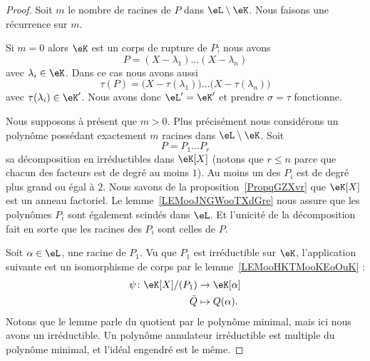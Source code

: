 \begin{proof}
	Soit \( m\) le nombre de racines de \( P\) dans \( \eL\setminus \eK\). Nous faisons une récurrence sur \( m\).

	Si \( m=0\) alors \( \eK\) est un corps de rupture de \( P\); nous avons
	\begin{equation}
		P=(X-\lambda_1)\ldots (X-\lambda_n)
	\end{equation}
	avec \( \lambda_i\in \eK\). Dans ce cas nous avons aussi
	\begin{equation}
		\tau(P)=\big( X-\tau(\lambda_1) \big)\ldots \big( X-\tau(\lambda_n) \big)
	\end{equation}
	avec \( \tau(\lambda_i)\in \eK'\). Nous avons donc \( \eL'=\eK'\) et prendre \( \sigma=\tau\) fonctionne.

	Nous supposons à présent que \( m>0\). Plus précisément nous considérons un polynôme possédant exactement \( m\) racines dans \( \eL\setminus \eK\). Soit
	\begin{equation}
		P=P_1\ldots P_r
	\end{equation}
	sa décomposition en irréductibles dans \( \eK[X]\) (notons que \( r\leq n\) parce que chacun des facteurs est de degré au moins \( 1\)). Au moins un des \( P_i\) est de degré plus grand ou égal à \( 2\). Nous savons de la proposition~\ref{PropqGZXvr} que \( \eK[X]\) est un anneau factoriel. Le lemme~\ref{LEMooJNGWooTXdGre} nous assure que les polynômes \( P_i\) sont également scindés dans \( \eL\). Et l'unicité de la décomposition fait en sorte que les racines des \( P_i\) sont celles de \( P\).

	Soit \( \alpha\in \eL\), une racine de \( P_1\). Vu que \( P_1\) est irréductible sur \( \eK\), l'application suivante est un isomorphisme de corps par le lemme~\ref{LEMooHKTMooKEoOuK} :
	\begin{equation}
		\begin{aligned}
			\psi\colon \eK[X]/(P_1) & \to \eK[\alpha]    \\
			\bar Q                  & \mapsto Q(\alpha).
		\end{aligned}
	\end{equation}
	Notons que le lemme parle du quotient par le polynôme minimal, mais ici nous avons un irréductible. Un polynôme annulateur irréductible est multiple du polynôme minimal, et l'idéal engendré est le même.


\end{proof}
